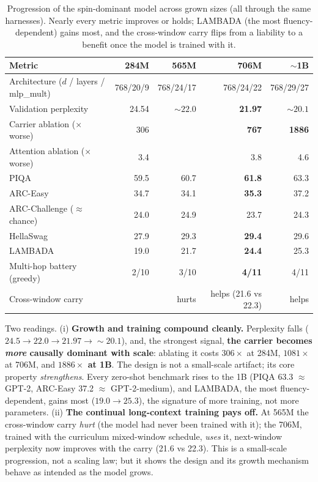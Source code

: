 \documentclass[11pt]{article}
\begin{document}
\begin{table}[h]\centering\small
\caption{Progression of the spin-dominant model across grown sizes (all through the same harnesses). Nearly every metric improves or holds; LAMBADA (the most fluency-dependent) gains most, and the cross-window carry flips from a liability to a benefit once the model is trained with it.}
\begin{tabular}{@{}l r r r r@{}}
\toprule
Metric & 284M & 565M & 706M & ${\sim}$1B \\
\midrule
Architecture ($d$ / layers / mlp\_mult) & 768/20/9 & 768/24/17 & 768/24/22 & 768/29/27 \\
Validation perplexity & 24.54 & ${\sim}22.0$ & \textbf{21.97} & \textbf{${\sim}20.1$} \\
Carrier ablation ($\times$ worse) & 306 & & \textbf{767} & \textbf{1886} \\
Attention ablation ($\times$ worse) & 3.4 & & 3.8 & 4.6 \\
PIQA & 59.5 & 60.7 & \textbf{61.8} & 63.3 \\
ARC-Easy & 34.7 & 34.1 & \textbf{35.3} & 37.2 \\
ARC-Challenge (${\approx}$chance) & 24.0 & 24.9 & 23.7 & 24.3 \\
HellaSwag & 27.9 & 29.3 & \textbf{29.4} & 29.6 \\
LAMBADA & 19.0 & 21.7 & \textbf{24.4} & 25.3 \\
Multi-hop battery (greedy) & 2/10 & 3/10 & \textbf{4/11} & 4/11 \\
Cross-window carry & & hurts & helps (21.6 vs 22.3) & helps \\
\bottomrule
\end{tabular}
\end{table}

Two readings. (i) \textbf{Growth and training compound cleanly.} Perplexity falls ($24.5 \to 22.0 \to 21.97 \to {\sim}20.1$), and, the strongest signal, \textbf{the carrier becomes \emph{more} causally dominant with scale}: ablating it costs $306\times$ at 284M, $1081\times$ at 706M, and \textbf{$1886\times$ at 1B}. The design is not a small-scale artifact; its core property \emph{strengthens}. Every zero-shot benchmark rises to the 1B (PIQA 63.3 ${\approx}$ GPT-2, ARC-Easy 37.2 ${\approx}$ GPT-2-medium), and LAMBADA, the most fluency-dependent, gains most ($19.0 \to 25.3$), the signature of more training, not more parameters. (ii) \textbf{The continual long-context training pays off.} At 565M the cross-window carry \emph{hurt} (the model had never been trained with it); the 706M, trained with the curriculum mixed-window schedule, \emph{uses} it, next-window perplexity now improves with the carry (21.6 vs 22.3). This is a small-scale progression, not a scaling law; but it shows the design and its growth mechanism behave as intended as the model grows.
\end{document}
